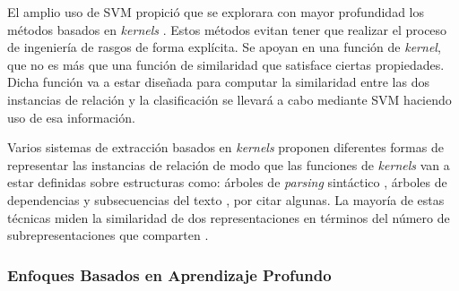 El amplio uso de SVM propició que se explorara con mayor profundidad los métodos basados en \textit{kernels} \cite{vapnik1998statistical}. Estos métodos evitan tener que realizar el proceso de ingeniería de rasgos de forma explícita. Se apoyan en una función de \textit{kernel}, que no es más que una función de similaridad que satisface ciertas propiedades. Dicha función va a estar diseñada para computar la similaridad entre las dos instancias de relación y la clasificación se llevará a cabo mediante SVM haciendo uso de esa información. 

Varios sistemas de extracción basados en \textit{kernels} proponen diferentes formas de representar las instancias de relación de modo que las funciones de \textit{kernels} van a estar definidas sobre estructuras como: árboles de \textit{parsing} sintáctico \cite{zelenko2002kernel, zhou2007tree}, árboles de dependencias \cite{culotta2004dependency,bunescu2005shortest} y subsecuencias del texto \cite{zhao2005kernel,bunescu2005subsequence}, por citar algunas. La mayoría de estas técnicas miden la similaridad de dos representaciones en términos del número de subrepresentaciones que comparten \cite{pawar2017survey}.  






\subsubsection{Enfoques Basados en Aprendizaje Profundo}



